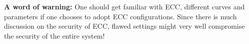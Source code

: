 \textbf{A word of warning:} One should get familiar with ECC, different curves and
parameters if one chooses to adopt ECC configurations. Since there is much 
discussion on the security of ECC, flawed settings might very well compromise the 
security of the entire system!


